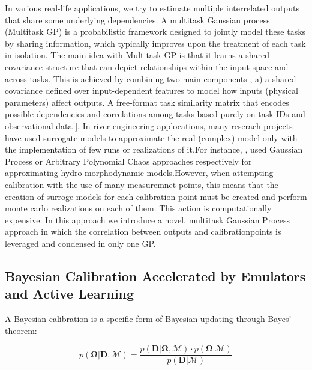 \documentclass[draft,linenumbers,onecolumn]{agujournal2019} %
\begin{document}
In various real-life applications, we try to estimate multiple interrelated outputs that share some underlying dependencies. A multitask Gaussian process (Multitask GP) is a probabilistic framework designed to jointly model these tasks by sharing information, which typically improves upon the treatment of each task in isolation. The main idea with Multitask GP is that it learns a shared covariance structure that can depict relationships within the input space and across tasks. This is achieved by combining two main components , a) a shared covariance defined over input-dependent features to model how inputs (physical parameters) affect outputs. 
A free-format task similarity matrix that encodes possible dependencies and correlations among tasks based purely on task IDs and observational data \cite{bonilla2007multitask}]. In river engineering applocations, many reserach projects have used surrogate models to approximate the real (complex) model only with the implementation of few runs or realizations of it.For instance, \cite{mouris2023stability} , \cite{beckers2020bayesian} used Gaussian Process or Arbitrary Polynomial Chaos approaches respectively for approximating hydro-morphodynamic models.However, when attempting calibration with the use of many measuremnet points, this means that the creation of surroge models for each calibration point must be created and perform monte carlo realizations on each of them. This action is computationally expensive. In this approach we introduce a novel, multitask Gaussian Process approach in which the correlation between outputs and calibrationpoints is leveraged and condensed in only one GP. 







\subsection{Bayesian Calibration Accelerated by Emulators and Active Learning}
\label{sec:bayesCal}

A Bayesian calibration is a specific form of Bayesian updating through Bayes' theorem:

\begin{equation}
	p\left( \mathbf{\Omega} \vert \mathbf{D},\mathcal{M} \right) = \frac{p\left( \mathbf{D} \vert \mathbf{\Omega},\mathcal{M} \right) \cdot p\left( \mathbf{\Omega}\vert \mathcal{M}\right) }{p\left( \mathbf{D}\vert\mathcal{M}\right) }
	\label{eq:Bayes}
\end{equation}
\end{document}
